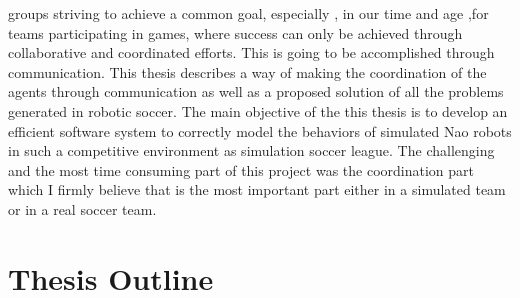 groups striving to achieve a common goal, especially , in our time and age ,for teams participating in games, where success can only be achieved through collaborative and coordinated efforts. This is going to be accomplished through communication. This thesis describes a way of making the coordination of the agents through communication as well as a proposed solution of all the problems generated in robotic soccer. 
The main objective of the this thesis is to develop an efficient software system to correctly model the behaviors of simulated
Nao robots in such a competitive environment as simulation soccer league. The challenging and the most time consuming part of this project was the coordination part which I firmly believe that is the most important part either in a simulated team or in a real soccer team.



\section{Thesis Outline}